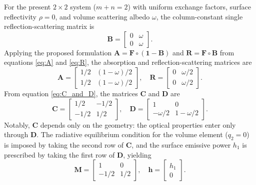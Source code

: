 \documentclass[preprint,1p,times]{elsarticle}
\theoremstyle{plain}
\theoremstyle{definition}
\theoremstyle{remark}
\begin{document}
For the present $2\times 2$ system ($m+n=2$) with uniform exchange factors, surface reflectivity $\rho=0$, and volume scattering albedo $\omega$, the column-constant single reflection-scattering matrix is
\begin{equation}
\mathbf{B} = \begin{bmatrix} 0 & \omega \\ 0 & \omega \end{bmatrix}.
\end{equation}
Applying the proposed formulation $\mathbf{A} = \mathbf{F} \circ (\mathbf{1}-\mathbf{B})$ and $\mathbf{R} = \mathbf{F} \circ \mathbf{B}$ from equations \eqref{eq:A} and \eqref{eq:R}, the absorption and reflection-scattering matrices are
\begin{equation}
\mathbf{A} = \begin{bmatrix} 1/2 & (1-\omega)/2 \\ 1/2 & (1-\omega)/2 \end{bmatrix},
\quad
\mathbf{R} = \begin{bmatrix} 0 & \omega/2 \\ 0 & \omega/2 \end{bmatrix}.
\end{equation}
From equation \eqref{eq:C_and_D}, the matrices $\mathbf{C}$ and $\mathbf{D}$ are
\begin{equation}
\mathbf{C} = \begin{bmatrix} 1/2 & -1/2 \\ -1/2 & 1/2 \end{bmatrix},
\quad
\mathbf{D} = \begin{bmatrix} 1 & 0 \\ -\omega/2 & 1-\omega/2 \end{bmatrix}.
\end{equation}
Notably, $\mathbf{C}$ depends only on the geometry: the optical properties enter only through $\mathbf{D}$. The radiative equilibrium condition for the volume element ($q_2 = 0$) is imposed by taking the second row of $\mathbf{C}$, and the surface emissive power $h_1$ is prescribed by taking the first row of $\mathbf{D}$, yielding
\begin{equation}
\mathbf{M} = \begin{bmatrix} 1 & 0 \\ -1/2 & 1/2 \end{bmatrix},
\quad
\mathbf{h} = \begin{bmatrix} h_1 \\ 0 \end{bmatrix}.
\end{equation}
\end{document}

